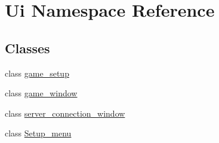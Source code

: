 \hypertarget{namespaceUi}{\section{Ui Namespace Reference}
\label{namespaceUi}
}
\subsection*{Classes}
\begin{DoxyCompactItemize}
\item 
class \hyperlink{classUi_1_1game__setup}{game\-\_\-setup}
\item 
class \hyperlink{classUi_1_1game__window}{game\-\_\-window}
\item 
class \hyperlink{classUi_1_1server__connection__window}{server\-\_\-connection\-\_\-window}
\item 
class \hyperlink{classUi_1_1Setup__menu}{Setup\-\_\-menu}
\end{DoxyCompactItemize}
